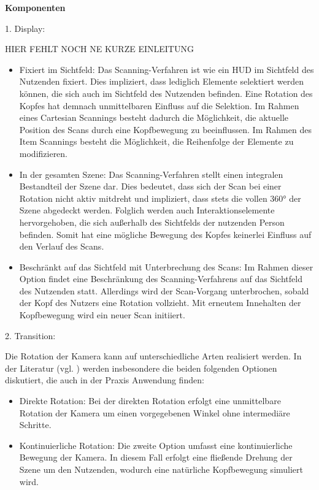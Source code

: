 {\normalfont \bfseries Komponenten}  

1. Display:

HIER FEHLT NOCH NE KURZE EINLEITUNG 

\begin{itemize}
    \item Fixiert im Sichtfeld: Das Scanning-Verfahren ist wie ein HUD im Sichtfeld des Nutzenden fixiert. Dies impliziert, dass lediglich Elemente selektiert werden können, die sich auch im Sichtfeld des Nutzenden befinden. Eine Rotation des Kopfes hat demnach unmittelbaren Einfluss auf die Selektion. Im Rahmen eines Cartesian Scannings besteht dadurch die Möglichkeit, die aktuelle Position des Scans durch eine Kopfbewegung zu beeinflussen. Im Rahmen des Item Scannings besteht die Möglichkeit, die Reihenfolge der Elemente zu modifizieren.
    \item In der gesamten Szene: Das Scanning-Verfahren stellt einen integralen Bestandteil der Szene dar. Dies bedeutet, dass sich der Scan bei einer Rotation nicht aktiv mitdreht und impliziert, dass stets die vollen 360° der Szene abgedeckt werden. Folglich werden auch Interaktionselemente hervorgehoben, die sich außerhalb des Sichtfelds der nutzenden Person befinden. Somit hat eine mögliche Bewegung des Kopfes keinerlei Einfluss auf den Verlauf des Scans.
    \item Beschränkt auf das Sichtfeld mit Unterbrechung des Scans: Im Rahmen dieser Option findet eine Beschränkung des Scanning-Verfahrens auf das Sichtfeld des Nutzenden statt. Allerdings wird der Scan-Vorgang unterbrochen, sobald der Kopf des Nutzers eine Rotation vollzieht. Mit erneutem Innehalten der Kopfbewegung wird ein neuer Scan initiiert. 
\end{itemize}

2. Transition: 

Die Rotation der Kamera kann auf unterschiedliche Arten realisiert werden. In der Literatur (vgl. \citet{10.1145/3441852.3471230, 10.1007/s10055-020-00425-x, 8797722}) werden insbesondere die beiden folgenden Optionen diskutiert, die auch in der Praxis Anwendung finden: 

\begin{itemize}
    \item Direkte Rotation: Bei der direkten Rotation erfolgt eine unmittelbare Rotation der Kamera um einen vorgegebenen Winkel ohne intermediäre Schritte. 
    \item Kontinuierliche Rotation: Die zweite Option umfasst eine kontinuierliche Bewegung der Kamera. In diesem Fall erfolgt eine fließende Drehung der Szene um den Nutzenden, wodurch eine natürliche Kopfbewegung simuliert wird. 
\end{itemize}


